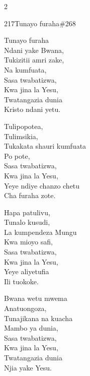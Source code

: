 \begin{multicols}{2}
\begin{hymn}{217}{Tunayo furaha}{\#268}
\begin{stanza}
Tunayo furaha\\
Ndani yake Bwana,\\
Tukizitii amri zake,\\
Na kumfuata,\\
Sasa twabatizwa,\\
Kwa jina la Yesu,\\
Twatangazia dunia\\
Kristo ndani yetu.
\end{stanza}
\begin{stanza}
Tulipopotea,\\
Tulimsikia,\\
Tukakata shauri kumfuata\\
Po pote,\\
Sasa twabatizwa,\\
Kwa jina la Yesu,\\
Yeye ndiye chanzo chetu\\
Cha furaha zote.
\end{stanza}
\begin{stanza}
Hapa patulivu,\\
Tunalo kusudi,\\
La kumpendeza Mungu\\
Kwa mioyo safi,\\
Sasa twabatizwa,\\
Kwa jina la Yesu,\\
Yeye aliyetufia\\
Ili tuokoke.
\end{stanza}
\begin{stanza}
Bwana wetu mwema\\
Anatuongoza,\\
Tunajikana na kuacha\\
Mambo ya dunia,\\
Sasa twabatizwa,\\
Kwa jina la Yesu,\\
Twatangazia dunia\\
Njia yake Yesu.
\end{stanza}
\end{hymn}


\end{multicols}
